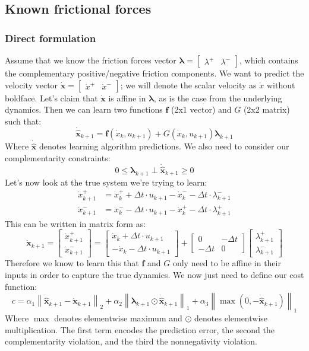 \documentclass{article}
\renewcommand{\vec}[1]{\boldsymbol{#1}}
\newcommand{\rvec}[1]{\begin{bmatrix} #1 \end{bmatrix}}
\newcommand{\norm}[1]{\left\lVert#1\right\rVert}
\begin{document}
\subsection{Known frictional forces}

\subsubsection{Direct formulation}
Assume that we know the friction forces vector $\vec{\lambda} = \rvec{\lambda^+ & \lambda^-}$, which contains the complementary positive/negative friction components. We want to predict the velocity vector $\vec{\dot x} = \rvec{\dot x^+ & \dot x^-}$; we will denote the scalar velocity as $\dot x$ without boldface. Let's claim that $\vec{\dot x}$ is affine in $\vec{\lambda}$, as is the case from the underlying dynamics. Then we can learn two functions $\vec{f}$ (2x1 vector) and $G$ (2x2 matrix) such that:
\[
    \vec{\dot{\hat x}}_{k+1} = \vec{f}(\dot x_k, u_{k+1}) + G(\dot x_k, u_{k+1}) \vec{\lambda}_{k+1}
\]
Where $\vec{\dot{\hat x}}$ denotes learning algorithm predictions. We also need to consider our complementarity constraints:
\[
    0 \leq \vec{\lambda}_{k+1} \perp \vec{\dot{\hat x}}_{k+1} \geq 0
\]
Let's now look at the true system we're trying to learn:
\begin{align*}
    \dot x^+_{k+1} &= \dot x^+_k + \Delta t \cdot u_{k+1} - \dot x^-_{k} - \Delta t \cdot \lambda^-_{k+1} \\
    \dot x^-_{k+1} &= \dot x^-_k - \Delta t \cdot u_{k+1} - \dot x^+_{k} - \Delta t \cdot \lambda^+_{k+1}
\end{align*}
This can be written in matrix form as:
\[
    \vec{\dot x}_{k+1} = \begin{bmatrix} \dot x^+_{k+1} \\ \dot x^-_{k+1} \end{bmatrix}
    =
    \begin{bmatrix}
        \dot x_k + \Delta t \cdot u_{k+1} \\
       -\dot x_k - \Delta t \cdot u_{k+1}
    \end{bmatrix}
    +
    \begin{bmatrix}
        0 & -\Delta t \\
        -\Delta t & 0
    \end{bmatrix}
    \begin{bmatrix}
        \lambda^+_{k+1} \\
        \lambda^-_{k+1}
    \end{bmatrix}
\]
Therefore we know to learn this that $\vec{f}$ and $G$ only need to be affine in their inputs in order to capture the true dynamics. We now just need to define our cost function:
\[
    c = \alpha_1 \norm{\vec{\dot{\hat x}}_{k+1} - \vec{\dot x}_{k+1}}_2 + \alpha_2 \norm{\vec{\lambda}_{k+1} \odot \vec{\dot{\hat x}}_{k+1}}_1 + \alpha_3 \norm{\max \left(0, -\vec{\dot{\hat x}}_{k+1}\right)}_1
\] 
Where $\max$ denotes elementwise maximum and $\odot$ denotes elementwise multiplication. The first term encodes the prediction error, the second the complementarity violation, and the third the nonnegativity violation.
\end{document}
